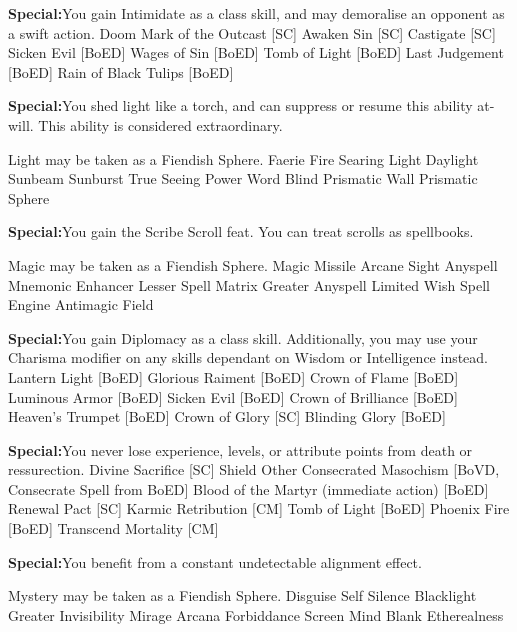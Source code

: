 \textbf{Special:}{You gain Intimidate as a class skill, and may demoralise an opponent as a swift action.}
\sphere
{Doom}
{Mark of the Outcast [SC]}
{Awaken Sin [SC]}
{Castigate [SC]}
{Sicken Evil [BoED]}
{Wages of Sin [BoED]}
{Tomb of Light [BoED]}
{Last Judgement [BoED]}
{Rain of Black Tulips [BoED]}

\textbf{Special:}{You shed light like a torch, and can suppress or resume this ability at-will. This ability is considered extraordinary.}

Light may be taken as a Fiendish Sphere.
\sphere
{Faerie Fire}
{Searing Light}
{Daylight}
{Sunbeam}
{Sunburst}
{True Seeing}
{Power Word Blind}
{Prismatic Wall}
{Prismatic Sphere}

\textbf{Special:}{You gain the Scribe Scroll feat. You can treat scrolls as spellbooks.}

Magic may be taken as a Fiendish Sphere.
\sphere
{Magic Missile}
{Arcane Sight}
{Anyspell}
{Mnemonic Enhancer}
{Lesser Spell Matrix}
{Greater Anyspell}
{Limited Wish}
{Spell Engine}
{Antimagic Field}

\textbf{Special:}{You gain Diplomacy as a class skill. Additionally, you may use your Charisma modifier on any skills dependant on Wisdom or Intelligence instead.}
\sphere
{Lantern Light [BoED]}
{Glorious Raiment [BoED]}
{Crown of Flame [BoED]}
{Luminous Armor [BoED]}
{Sicken Evil [BoED]}
{Crown of Brilliance [BoED] }
{Heaven's Trumpet [BoED]}
{Crown of Glory [SC]}
{Blinding Glory [BoED]}

\textbf{Special:}{You never lose experience, levels, or attribute points from death or ressurection.}
\sphere
{Divine Sacrifice [SC]}
{Shield Other}
{Consecrated Masochism [BoVD, Consecrate Spell from BoED]}
{Blood of the Martyr (immediate action) [BoED]}
{Renewal Pact [SC]}
{Karmic Retribution [CM]}
{Tomb of Light [BoED]}
{Phoenix Fire [BoED]}
{Transcend Mortality [CM]}

\textbf{Special:}{You benefit from a constant undetectable alignment effect.}

Mystery may be taken as a Fiendish Sphere.
\sphere
{Disguise Self}
{Silence}
{Blacklight}
{Greater Invisibility}
{Mirage Arcana}
{Forbiddance}
{Screen}
{Mind Blank}
{Etherealness}

